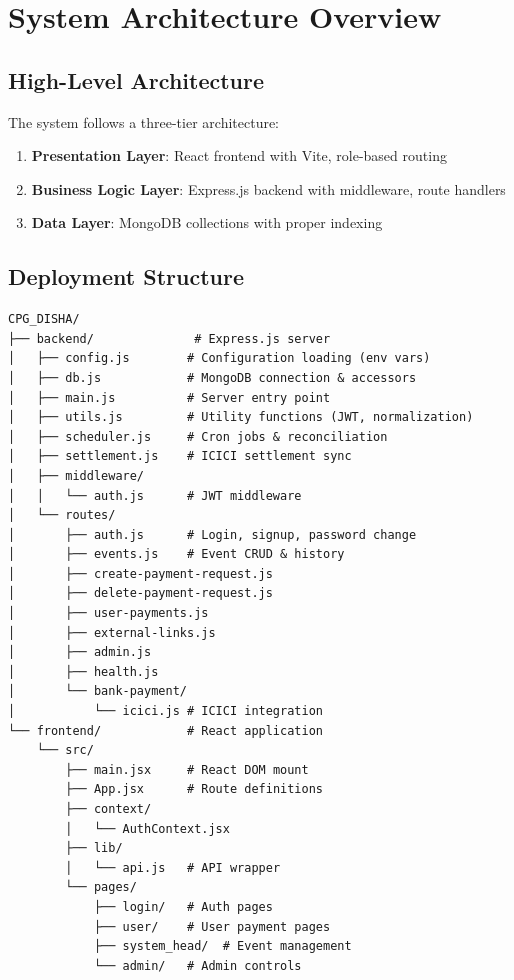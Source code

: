 \documentclass[12pt,a4paper]{article}
\begin{document}
\section{System Architecture Overview}

\subsection{High-Level Architecture}
The system follows a three-tier architecture:
\begin{enumerate}
  \item \textbf{Presentation Layer}: React frontend with Vite, role-based routing
  \item \textbf{Business Logic Layer}: Express.js backend with middleware, route handlers
  \item \textbf{Data Layer}: MongoDB collections with proper indexing
\end{enumerate}

\subsection{Deployment Structure}
\begin{lstlisting}
CPG_DISHA/
├── backend/              # Express.js server
│   ├── config.js        # Configuration loading (env vars)
│   ├── db.js            # MongoDB connection & accessors
│   ├── main.js          # Server entry point
│   ├── utils.js         # Utility functions (JWT, normalization)
│   ├── scheduler.js     # Cron jobs & reconciliation
│   ├── settlement.js    # ICICI settlement sync
│   ├── middleware/
│   │   └── auth.js      # JWT middleware
│   └── routes/
│       ├── auth.js      # Login, signup, password change
│       ├── events.js    # Event CRUD & history
│       ├── create-payment-request.js
│       ├── delete-payment-request.js
│       ├── user-payments.js
│       ├── external-links.js
│       ├── admin.js
│       ├── health.js
│       └── bank-payment/
│           └── icici.js # ICICI integration
└── frontend/            # React application
    └── src/
        ├── main.jsx     # React DOM mount
        ├── App.jsx      # Route definitions
        ├── context/
        │   └── AuthContext.jsx
        ├── lib/
        │   └── api.js   # API wrapper
        └── pages/
            ├── login/   # Auth pages
            ├── user/    # User payment pages
            ├── system_head/  # Event management
            └── admin/   # Admin controls
\end{lstlisting}
\end{document}
